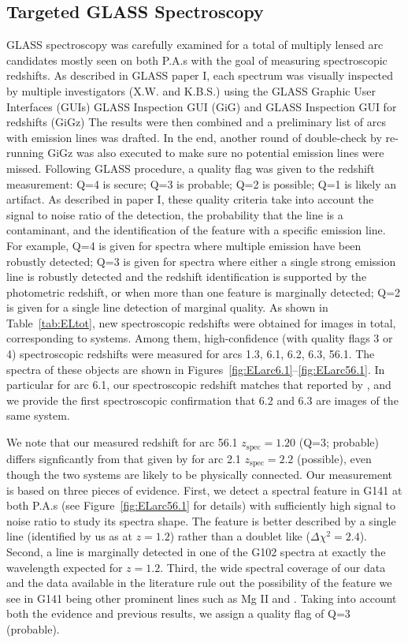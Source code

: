 \subsection{Targeted GLASS Spectroscopy}
\label{subsec:targeted}

GLASS spectroscopy was carefully examined for a total of \NimgTOT{}
multiply lensed arc candidates mostly seen on both P.A.s with the goal
of measuring spectroscopic redshifts.  As described in GLASS paper I,
each spectrum was visually inspected by multiple investigators
(X.W. and K.B.S.) using the GLASS Graphic User Interfaces (GUIs) GLASS
Inspection GUI (GiG) and GLASS Inspection GUI for redshifts (GiGz) The
results were then combined and a preliminary list of arcs with
emission lines was drafted. In the end, another round of double-check
by re-running GiGz was also executed to make sure no potential
emission lines were missed. Following GLASS procedure, a quality flag
was given to the redshift measurement: Q=4 is secure; Q=3 is probable;
Q=2 is possible; Q=1 is likely an artifact. As described in paper I,
these quality criteria take into account the signal to noise ratio of
the detection, the probability that the line is a contaminant, and the
identification of the feature with a specific emission line. For
example, Q=4 is given for spectra where multiple emission have been
robustly detected; Q=3 is given for spectra where either a single
strong emission line is robustly detected and the redshift
identification is supported by the photometric redshift, or when more
than one feature is marginally detected; Q=2 is given for a single
line detection of marginal quality. As shown in Table~\ref{tab:ELtot},
new spectroscopic redshifts were obtained for \NimgELtot{} images in
total, corresponding to \NsysELtot{} systems. Among them, \NimgELhiQ{}
high-confidence (with quality flags 3 or 4) spectroscopic redshifts
were measured for arcs 1.3, 6.1, 6.2, 6.3, 56.1. The spectra of these
objects are shown in
Figures~\ref{fig:ELarc6.1}--\ref{fig:ELarc56.1}. In particular for arc
6.1, our spectroscopic redshift matches that reported by
\citet{2014MNRAS.444..268R}, and we provide the first spectroscopic
confirmation that 6.2 and 6.3 are images of the same system.

We note that our measured redshift for arc 56.1 $z_{\textrm{spec}}=1.20$ (Q=3; probable) differs signficantly
from that given by \citet{Johnson:2014p37801} for arc 2.1 $z_{\textrm{spec}}=2.2$ (possible), even though the two
systems are likely to be physically connected.  Our measurement is based on three pieces of evidence. First, we
detect a spectral feature in G141 at both P.A.s (see Figure~\ref{fig:ELarc56.1} for details) with sufficiently
high signal to noise ratio to study its spectra shape. The feature is better described by a single line
(identified by us as \Ha at $z=1.2$) rather than a doublet like \OIII ($\Delta \chi^2=2.4$). Second, a
line is marginally detected in one of the G102 spectra at exactly the wavelength expected for \OIII $z=1.2$.
Third, the wide spectral coverage of our data and the data available in the literature rule out the possibility
of the feature we see in G141 being other prominent lines such as Mg II and \OII. Taking into account both the
evidence and previous results, we assign a quality flag of Q=3 (probable).

